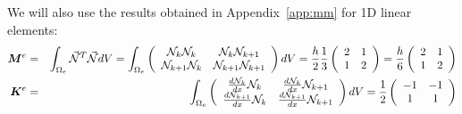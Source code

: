 \newpage
We will also use the results obtained in Appendix~\ref{app:mm} for 1D linear elements:
\begin{eqnarray}
{\bm M}^e
&=&\int_{\Omega_e} \vec{{\mathcal{N}}}^T \vec{{\mathcal{N}}} dV
=\int_{\Omega_e} 
\left(
\begin{array}{cc}
 {\mathcal{N}}_k {\mathcal{N}}_k & {\mathcal{N}}_k {\mathcal{N}}_{k+1} \\
 {\mathcal{N}}_{k+1} {\mathcal{N}}_k & {\mathcal{N}}_{k+1}{\mathcal{N}}_{k+1}
\end{array}
\right)
dV 
= \frac{h}{2} \frac{1}{3} 
\left(
\begin{array}{cc}
2  & 1 \\
1 & 2
\end{array}
\right)
= 
\frac{h}{6}
\left(
\begin{array}{cc}
2  & 1 \\
1 & 2
\end{array}
\right)
\nonumber\\
{\bm K}^e &=&
\int_{\Omega_e} 
\left(
\begin{array}{cc}
\frac{d{\mathcal{N}}_k}{dx} {\mathcal{N}}_k     & \frac{d{\mathcal{N}}_k}{dx} {\mathcal{N}}_{k+1} \\
\frac{d{\mathcal{N}}_{k+1}}{dx} {\mathcal{N}}_k & \frac{d{\mathcal{N}}_{k+1}}{dx} {\mathcal{N}}_{k+1}
\end{array}
\right)
dV
=
\frac{1}{2}
\left(
\begin{array}{cc}
-1  & -1 \\
1 & 1
\end{array}
\right)
\end{eqnarray}



